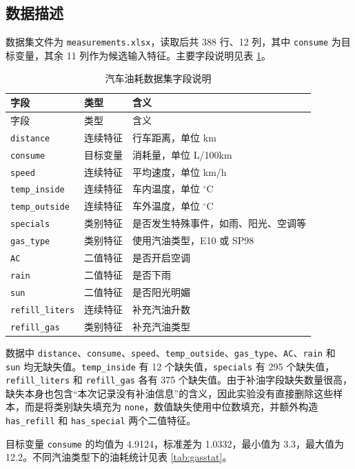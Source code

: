 \documentclass[UTF8,a4paper,12pt]{ctexart}
\begin{document}
\subsection{数据描述}

数据集文件为 \texttt{measurements.xlsx}，读取后共 388 行、12 列，其中 \texttt{consume} 为目标变量，其余 11 列作为候选输入特征。主要字段说明见表 \ref{tab:features}。

\begin{longtable}{lll}
\caption{汽车油耗数据集字段说明}\label{tab:features}\\
\toprule
字段 & 类型 & 含义\\
\midrule
\endfirsthead
\toprule
字段 & 类型 & 含义\\
\midrule
\endhead
\texttt{distance} & 连续特征 & 行车距离，单位 km\\
\texttt{consume} & 目标变量 & 消耗量，单位 L/100km\\
\texttt{speed} & 连续特征 & 平均速度，单位 km/h\\
\texttt{temp\_inside} & 连续特征 & 车内温度，单位 $^\circ$C\\
\texttt{temp\_outside} & 连续特征 & 车外温度，单位 $^\circ$C\\
\texttt{specials} & 类别特征 & 是否发生特殊事件，如雨、阳光、空调等\\
\texttt{gas\_type} & 类别特征 & 使用汽油类型，E10 或 SP98\\
\texttt{AC} & 二值特征 & 是否开启空调\\
\texttt{rain} & 二值特征 & 是否下雨\\
\texttt{sun} & 二值特征 & 是否阳光明媚\\
\texttt{refill\_liters} & 连续特征 & 补充汽油升数\\
\texttt{refill\_gas} & 类别特征 & 补充汽油类型\\
\bottomrule
\end{longtable}

数据中 \texttt{distance}、\texttt{consume}、\texttt{speed}、\texttt{temp\_outside}、\texttt{gas\_type}、\texttt{AC}、\texttt{rain} 和 \texttt{sun} 均无缺失值。\texttt{temp\_inside} 有 12 个缺失值，\texttt{specials} 有 295 个缺失值，\texttt{refill\_liters} 和 \texttt{refill\_gas} 各有 375 个缺失值。由于补油字段缺失数量很高，缺失本身也包含“本次记录没有补油信息”的含义，因此实验没有直接删除这些样本，而是将类别缺失填充为 \texttt{none}，数值缺失使用中位数填充，并额外构造 \texttt{has\_refill} 和 \texttt{has\_special} 两个二值特征。

目标变量 \texttt{consume} 的均值为 4.9124，标准差为 1.0332，最小值为 3.3，最大值为 12.2。不同汽油类型下的油耗统计见表 \ref{tab:gasstat}。
\end{document}
